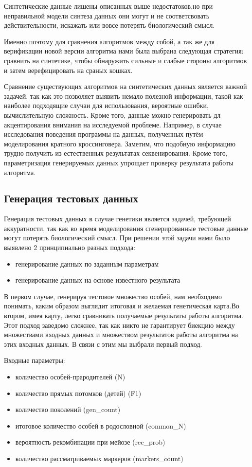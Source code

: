 \documentclass{matmex-diploma-custom}
\begin{document}
Синтетические данные лишены описанных выше недостатоков,но при
неправильной модели синтеза данных они могут и не соответсвовать
действительности, искажать или вовсе потерять биологический смысл.

Именно поэтому для сравнения алгоритмов между собой, а так же для
верификации новой версии алгоритма нами была выбрана следующая
стратегия: сравнить на синтетике, чтобы обнаружить сильные и слабые
стороны алгоритмов и затем верефицировать на сраных кошках.

Сравнение существующих алгоритмов на синтетических данных является
важной задачей, так как это позволяет выявить немало полезной
информации, такой как наиболее подходящие случаи для использования,
вероятные ошибки, вычислительную сложность. Кроме того, данные можно
генерировать дл акцентирования внимания на исследуемой
проблеме. Например, в случае исследования поведения программы на
данных, полученных путём моделирования кратного
кроссинговера. Заметим, что подобную информацию трудно получить из
естественных результатах секвенирования. Кроме того, параметризация
генерируемых данных упрощает проверку результата работы алгоритма.

\subsection{Генерация тестовых данных}

Генерация тестовых данных в случае генетики является задачей,
требующей аккуратности, так как во время моделирования сгенерированные
тестовые данные могут потерять биологический смысл.  При решении
этой задачи нами было выявлено 2 принципиально разных подхода:

\begin{itemize}
\item генерирование данных по заданным параметрам
\item генерирование данных на основе известного результата
\end{itemize}

В первом случае, генерируя тестовое множество особей, нам необходимо
понимать, каким образом выглядит итоговая и желаемая генетическая
карта.Во втором, имея карту, легко сравнивать получаемые результаты
работы алгоритма. Этот подход заведомо сложнее, так как никто не
гарантирует биекцию между множествами входных данных и множеством
результатов работы алгоритма на этих входных данных.  В связи с этим
мы выбрали первый подход.

Входные параметры:
\begin{itemize}
\item количество особей-прародителей (N)
\item количество прямых потомков (детей) (F1)
\item количество поколений (gen\_count)
\item итоговое количество особей в родословной (common\_N)
\item вероятность рекомбинации при мейозе (rec\_prob) %
\item количество рассматриваемых маркеров (markers\_count)
\end{itemize}
\end{document}
